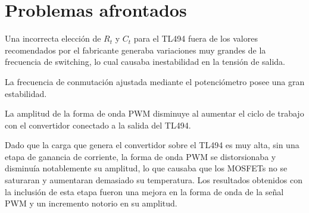 \section{Problemas afrontados}

Una incorrecta elección de $R_t$ y $C_t$ para el TL494 fuera de los valores recomendados por el fabricante generaba variaciones muy grandes de la frecuencia de switching, 
lo cual causaba inestabilidad en la tensión de salida. 

La frecuencia de conmutación ajustada mediante el potenciómetro posee una gran estabilidad.

La amplitud de la forma de onda PWM disminuye al aumentar el ciclo de trabajo con el convertidor conectado a la salida del TL494. 

Dado que la carga que genera el convertidor sobre el TL494 es muy alta, sin una etapa de ganancia de corriente, la forma de onda PWM 
se distorsionaba y disminuía notablemente su amplitud, lo que causaba que los MOSFETs no se saturaran y aumentaran demasiado su temperatura.
Los resultados obtenidos con la inclusión de esta etapa fueron una mejora en la forma de onda de la señal PWM y un incremento notorio en su amplitud.